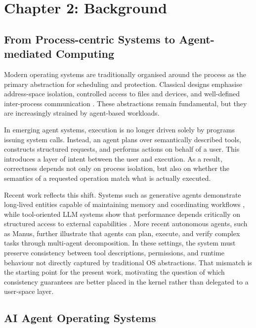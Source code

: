\section*{Chapter 2: Background}
\setcounter{section}{2} \setcounter{subsection}{0}
 {}



\subsection{From Process-centric Systems to Agent-mediated Computing}

Modern operating systems are traditionally organised around the process as the primary abstraction for scheduling and protection.
Classical designs emphasise address-space isolation, controlled access to files and devices, and well-defined inter-process communication \cite{tanenbaum2022}. 
These abstractions remain fundamental, but they are increasingly strained by agent-based workloads.

In emerging agent systems, execution is no longer driven solely by programs issuing system calls. 
Instead, an agent plans over semantically described tools, constructs structured requests, and performs actions on behalf of a user. 
This introduces a layer of intent between the user and execution. 
As a result, correctness depends not only on process isolation, but also on whether the semantics of a requested operation match what is actually executed.

Recent work reflects this shift. 
Systems such as generative agents demonstrate long-lived entities capable of maintaining memory and coordinating workflows \cite{park2023generative}, while tool-oriented LLM systems show that performance depends critically on structured access to external capabilities \cite{qin2024toolllm}.
More recent autonomous agents, such as Manus\cite{mei2024aios,liu2026agentos}, further illustrate that agents can plan, execute, and verify complex tasks through multi-agent decomposition. 
In these settings, the system must preserve consistency between tool descriptions, permissions, and runtime behaviour not directly captured by traditional OS abstractions.
That mismatch is the starting point for the present work, motivating the question of which consistency guarantees are better placed in the kernel rather than delegated to a user-space layer.



\subsection{AI Agent Operating Systems}

